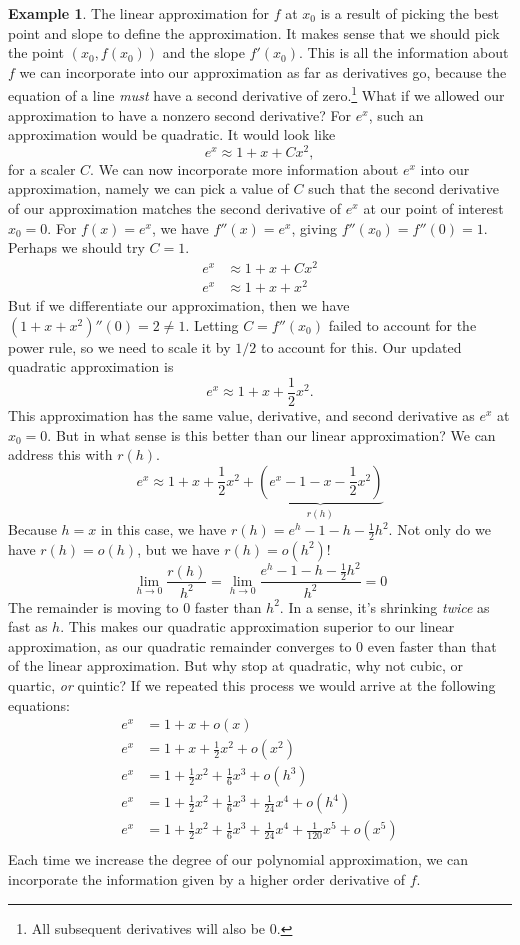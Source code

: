 \documentclass{article}
\theoremstyle{definition}
\newtheorem{example}{Example}[section]
\begin{document}
\begin{example}
		The linear approximation for $ f $ at $ x_0 $ is a result of picking the best point and slope to define the approximation. It makes sense that we should pick the point $ (x_0,f(x_0)) $ and the slope $ f'(x_0) $. This is all the information about $ f $ we can incorporate into our approximation as far as derivatives go, because the equation of a line \textit{must} have a second derivative of zero.\footnote{All subsequent derivatives will also be $ 0 $.} What if we allowed our approximation to have a nonzero second derivative? For $ e^x $, such an approximation would be quadratic. It would look like $$ e^x\approx 1+x+C x^2,$$ for a scaler $ C $. We can now incorporate more information about $ e^x $ into our approximation, namely we can pick a value of $ C $ such that the second derivative of our approximation matches the second derivative of $ e^x $ at our point of interest $ x_0=0 $. For $ f(x)=e^x $, we have $ f''(x)=e^x $, giving $ f''(x_0)=f''(0)=1 $. Perhaps we should try $ C=1 $. 
		\begin{align*}
			e^x&\approx 1+x+C x^2\\
			e^x&\approx 1+x+x^2
		\end{align*}
		But if we differentiate our approximation, then we have $ (1+x+x^2)''(0)=2\neq 1 $. Letting $ C=f''(x_0) $ failed to account for the power rule, so we need to scale it by $ 1/2 $ to account for this. Our updated quadratic approximation is
		$$ e^x\approx1+x+\frac{1}{2}x^2.$$
		This approximation has the same value, derivative, and second derivative as $ e^x $ at $ x_0=0 $. But in what sense is this better than our linear approximation? We can address this with $ r(h) $.
		$$ e^x\approx1+x+\frac{1}{2}x^2+\underbrace{(e^x-1-x-\frac{1}{2}x^2)}_{r(h)}$$
		Because $ h=x $ in this case, we have $r(h)=e^h-1-h-\frac{1}{2}h^2 $. Not only do we have $ r(h)=o(h) $, but we have $ r(h)=o(h^2) $!
		$$ \lim_{h\to 0}\frac{r(h)}{h^2}=\lim_{h\to 0}\frac{e^h-1-h-\frac{1}{2}h^2}{h^2}=0$$ The remainder is moving to $ 0 $ faster than $ h^2 $. In a sense, it's shrinking \textit{twice} as fast as $ h $.  This makes our quadratic approximation superior to our linear approximation, as our quadratic remainder converges to $ 0 $ even faster than that of the linear approximation. But why stop at quadratic, why not cubic, or quartic, \textit{or} quintic? If we repeated this process we would arrive at the following equations:
		\begin{align*}
			e^x&=1+x+o(x)\\
			e^x&=1+x+\frac{1}{2}x^2+o(x^2)\\
			e^x&=1+\frac{1}{2}x^2+\frac{1}{6}x^3+o(h^3)\\
			e^x&=1+\frac{1}{2}x^2+\frac{1}{6}x^3+\frac{1}{24}x^4+o(h^4)\\
			e^x&=1+\frac{1}{2}x^2+\frac{1}{6}x^3+\frac{1}{24}x^4+\frac{1}{120}x^5+o(x^5)\\
		\end{align*}
		Each time we increase the degree of our polynomial approximation, we can incorporate the information given by a higher order derivative of $ f $. 
	\end{example}
\end{document}
